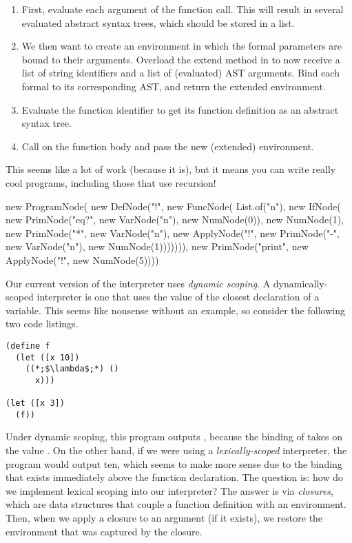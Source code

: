 \begin{enumerate}[label=(\alph*)]
  \begin{enumerate}[label=(\roman*)] 
  \item First, evaluate each argument of the function call. This will result in several evaluated abstract syntax trees, which should be stored in a list. 
  \item We then want to create an environment in which the formal parameters are bound to their arguments. Overload the extend method in  to now receive a list of string identifiers and a list of (evaluated) AST arguments. Bind each formal to its corresponding AST, and return the extended environment. 
  \item Evaluate the function identifier to get its function definition as an abstract syntax tree.
  \item Call  on the function body and pass the new (extended) environment.
  \end{enumerate}
  This seems like a lot of work (because it is), but it means you can write really cool programs, including those that use recursion!
  \enlargethispage{2\baselineskip}
  \begin{verbnobox}[\small]
new ProgramNode(
  new DefNode("!", 
    new FuncNode(
      List.of("n"),
      new IfNode(
        new PrimNode("eq?", 
          new VarNode("n"), 
          new NumNode(0)),
        new NumNode(1),
        new PrimNode("*", 
          new VarNode("n"), 
          new ApplyNode("!", 
            new PrimNode("-", 
            new VarNode("n"), 
            new NumNode(1))))))),
  new PrimNode("print", new ApplyNode("!", new NumNode(5))))
\end{verbnobox}
\end{enumerate}

Our current version of the interpreter uses \textit{dynamic scoping}. A dynamically-scoped interpreter is one that uses the value of the closest declaration of a variable. This seems like nonsense without an example, so consider the following two code listings.
\begin{lstlisting}[language=MyScheme, frame=single]
(define f
  (let ([x 10])
    ((*;$\lambda$;*) ()
      x)))

(let ([x 3])
  (f))
\end{lstlisting}

Under dynamic scoping, this program outputs , because the binding of  takes on the value . On the other hand, if we were using a \textit{lexically-scoped} interpreter, the program would output ten, which seems to make more sense due to the binding that exists immediately above the function declaration. The question is: how do we implement lexical scoping into our interpreter? The answer is via \textit{closures}, which are data structures that couple a function definition with an environment. Then, when we apply a closure to an argument (if it exists), we restore the environment that was captured by the closure. 


